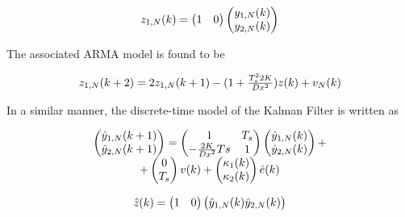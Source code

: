 \documentclass[journal]{IEEEtran}
\begin{document}
\begin{equation} \label{discrete_state_space_model2}
\begin{tabular}{c}
$z_{1,N}(k)=\begin{pmatrix}
1 & 0
\end{pmatrix}
\begin{pmatrix}
y_{1,N}(k) \\
y_{2,N}(k)
\end{pmatrix}$
\end{tabular}
\end{equation}

\noindent The associated ARMA model is found to be

\begin{equation} \label{ARMA_model1}
\begin{tabular}{c}
$z_{1,N}(k+2)=2z_{1,N}(k+1)-(1+{{{T_s^2}{2K}} \over {Dx^2}})z(k)+v_N(k)$
\end{tabular}
\end{equation}

\noindent In a similar manner, the discrete-time model of the Kalman Filter is written as

\begin{equation} \label{discrete_state_space_model1_KF}
\begin{tabular}{c}
$\begin{pmatrix}
\hat{y}_{1,N}(k+1) \\
\hat{y}_{2,N}(k+1)
\end{pmatrix}=
\begin{pmatrix}
1 & T_s \\
-{{2K} \over {Dx}^2}Ts & 1
\end{pmatrix}
\begin{pmatrix}
\hat{y}_{1,N}(k) \\
\hat{y}_{2,N}(k)
\end{pmatrix}+$\\
$+\begin{pmatrix}
0 \\
T_s
\end{pmatrix}v(k)+
\begin{pmatrix}
\kappa_1(k) \\
\kappa_2(k)
\end{pmatrix}\hat{e}(k)$
\end{tabular}
\end{equation}

\begin{equation} \label{discrete_state_space_model2_KF}
\begin{tabular}{c}
$\hat{z}(k)=\begin{pmatrix}
1 & 0
\end{pmatrix}
\begin{pmatrix}
\hat{y}_{1,N}(k)
\hat{y}_{2,N}(k)
\end{pmatrix}$
\end{tabular}
\end{equation}
\end{document}
